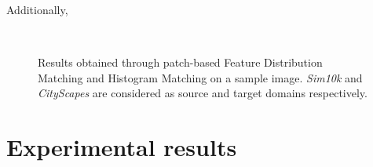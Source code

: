 \documentclass[%
    corpo=12pt,
    twoside,
    stile=classica,   
    tipotesi=magistrale,
    evenboxes,
    english,
	numerazioneromana,
]{toptesi}
\begin{document}
Additionally, 

\begin{figure}[ht]
	\centering
	\\
	\caption{Results obtained through patch-based Feature Distribution Matching and Histogram Matching on a sample image. \textit{Sim10k} and \textit{CityScapes} are considered as source and target domains respectively.}
	\label{fig:patchkis}
\end{figure}

\chapter{Experimental results}
\end{document}

